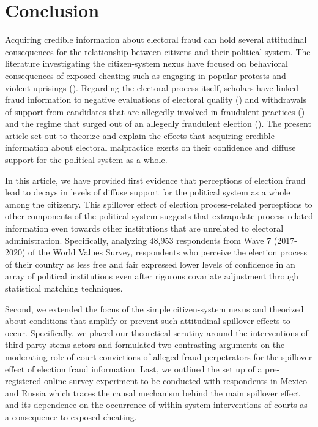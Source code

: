 \documentclass[11pt, ngerman,english,a4]{article}
\begin{document}





\vspace{1cm}

\section*{Conclusion}

Acquiring credible information about electoral fraud can hold several attitudinal consequences for the relationship between citizens and their political system. The literature investigating the citizen-system nexus have focused on behavioral consequences of exposed cheating such as engaging in popular protests and violent uprisings (\citealt{Daxecker2012}). Regarding the electoral process itself, scholars have linked fraud information to negative evaluations of electoral quality (\citealt{Robertson2017}) and withdrawals of support from candidates that are allegedly involved in fraudulent practices (\citealt{Reuter2019}) and the regime that surged out of an allegedly fraudulent election (\citealt{Williamson2021}). The present article set out to theorize and explain the effects that acquiring credible information about electoral malpractice exerts on their confidence and diffuse support for the political system as a whole. 

In this article, we have provided first evidence that perceptions of election fraud lead to decays in levels of diffuse support for the political system as a whole among the citizenry. This spillover effect of election process-related perceptions to other components of the political system suggests that extrapolate process-related information even towards other institutions that are unrelated to electoral administration. Specifically, analyzing 48,953 respondents from Wave 7 (2017-2020) of the World Values Survey, respondents who perceive the election process of their country as less free and fair expressed lower levels of confidence in an array of political institutions even after rigorous covariate adjustment through statistical matching techniques. 

Second, we extended the focus of the simple citizen-system nexus and theorized about conditions that amplify or prevent such attitudinal spillover effects to occur. Specifically, we placed our theoretical scrutiny around the interventions of third-party stems actors and formulated two contrasting arguments on the moderating role of court convictions of alleged fraud perpetrators for the spillover effect of election fraud information. Last, we outlined the set up of a pre-registered online survey experiment to be conducted with respondents in Mexico and Russia which traces the causal mechanism behind the main spillover effect and its dependence on the occurrence of within-system interventions of courts as a consequence to exposed cheating. 
\end{document}
